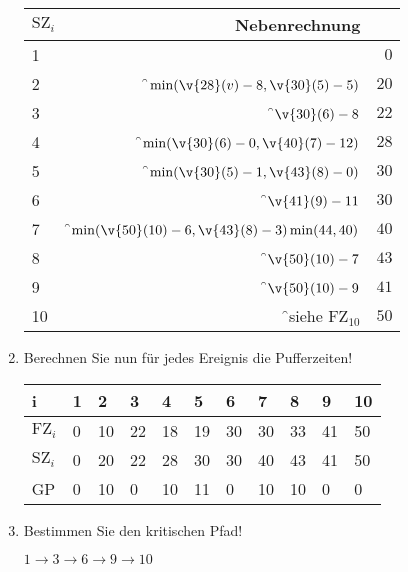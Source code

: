 \documentclass{lehramt-informatik-aufgabe}
\begin{document}
\begin{enumerate}
\begin{liAntwort}
\begin{tabular}{|l|r|r|}
\hline
$\text{SZ}_i$ & Nebenrechnung & \\\hline\hline
1 & & $0$ \\\hline
2 & \f$\min(\v{28}(v) - 8, \v{30}(5) - 5)$               & $20$ \\\hline
3 & \f$\v{30}(6) - 8$                                    & $22$ \\\hline
4 & \f$\min(\v{30}(6) - 0, \v{40}(7) - 12)$              & $28$ \\\hline
5 & \f$\min(\v{30}(5) - 1, \v{43}(8) - 0)$               & $30$ \\\hline
6 & \f$\v{41}(9) - 11$                                   & $30$ \\\hline
7 & \f$\min(\v{50}(10) - 6, \v{43}(8) - 3) \min(44, 40)$ & $40$ \\\hline
8 & \f$\v{50}(10) - 7$                                   & $43$ \\\hline
9 & \f$\v{50}(10) - 9$                                   & $41$ \\\hline
10 & \f{}siehe $\text{FZ}_10$                            & $50$ \\\hline
\end{tabular}
\end{liAntwort}


\item Berechnen Sie nun für jedes Ereignis die Pufferzeiten!

\begin{liAntwort}
\begin{tabular}{|l|l|l|l|l|l|l|l|l|l|l|}
\hline
i             & 1 & 2  & 3   & 4  & 5  & 6  & 7  & 8  & 9  & 10 \\\hline\hline
$\text{FZ}_i$ & 0 & 10 & 22  & 18 & 19 & 30 & 30 & 33 & 41 & 50 \\\hline
$\text{SZ}_i$ & 0 & 20 & 22  & 28 & 30 & 30 & 40 & 43 & 41 & 50 \\\hline
GP            & 0 & 10 & 0   & 10 & 11 & 0  & 10 & 10 & 0  & 0 \\\hline
\end{tabular}
\end{liAntwort}


\item Bestimmen Sie den kritischen Pfad!

\begin{liAntwort}
$1 \rightarrow 3 \rightarrow 6 \rightarrow 9 \rightarrow 10$


\end{liAntwort}
\end{enumerate}
\end{document}
